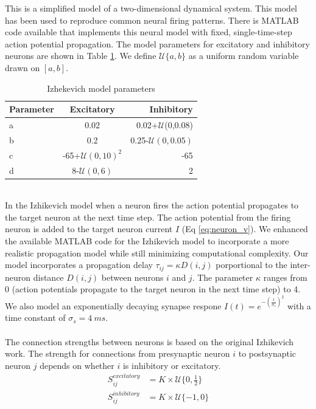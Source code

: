 \documentclass[a4paper,11pt]{article}
\begin{document}
This is a simplified model of a two-dimensional dynamical system.
This model has been used to reproduce common neural firing patterns.
There is MATLAB code available \cite{izzy_code} that implements this neural model with fixed, single-time-step action potential propagation.
The model parameters for excitatory and inhibitory neurons are shown in Table \ref{tab:izzy_params}.
We define $\mathcal{U}\{a,b \}$ as a uniform random variable drawn on $[ a,b ] $.
\begin{table}[!h]
 \caption{Izhekevich model parameters}
 \label{tab:izzy_params}
 \centering
 \begin{tabular}{l|c|r}
  \textbf{Parameter} & \textbf{Excitatory} & \textbf{Inhibitory} \\
  \hline
  a & 0.02 & 0.02+$\mathcal{U}$(0,0.08) \\
  b & 0.2 & 0.25-$\mathcal{U}(0,0.05)$\\
  c & -65+$\mathcal{U}(0,10)^2$ & -65 \\
  d & 8-$\mathcal{U}(0,6)$& 2 \\
 \end{tabular}
\end{table}
\\
In the Izhikevich model when a neuron fires the action potential propagates to the target neuron at the next time step.
The action potential from the firing neuron is added to the target neuron current $I$ (Eq \ref{eq:neuron_v}).
We enhanced the available MATLAB code for the Izhikevich model to incorporate a more realistic propagation model while still minimizing computational complexity.
Our model incorporates a propagation delay $\tau_{ij}=\kappa D(i,j)$ porportional to the inter-neuron distance $D(i,j)$ between neurons $i$ and $j$. 
The parameter $\kappa$ ranges from 0 (action potentials propagate to the target neuron in the next time step) to 4. 
We also model an exponentially decaying synapse respone $I(t)=e^{-(\frac{t}{\sigma_s})^2}$ with a time constant of $\sigma_s=4~ms$.
\\ \\
The connection strengths between neurons is based on the original Izhikevich work.
The strength for connections from presynaptic neuron $i$ to postsynaptic neuron $j$ depends on whether $i$ is inhibitory or excitatory.
\begin{align}
 S_{ij}^{excitatory} &= K \times \mathcal{U}\{0,\frac{1}{2} \} \\
 S_{ij}^{inhibitory} &= K \times \mathcal{U}\{-1,0 \} 
\end{align}
\end{document}
